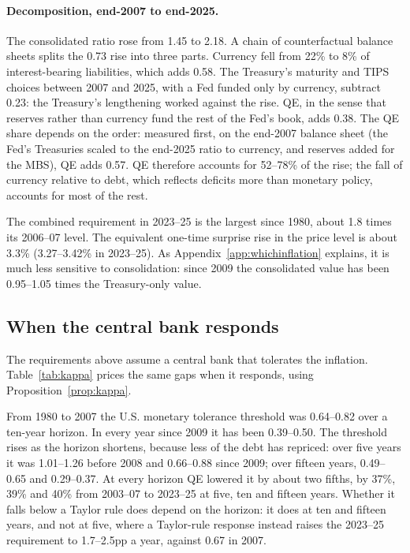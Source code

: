 \paragraph{Decomposition, end-2007 to end-2025.} The consolidated ratio rose from 1.45 to 2.18. A chain of counterfactual balance sheets splits the 0.73 rise into three parts. Currency fell from 22\% to 8\% of interest-bearing liabilities, which adds 0.58. The Treasury's maturity and TIPS choices between 2007 and 2025, with a Fed funded only by currency, subtract 0.23: the Treasury's lengthening worked against the rise. QE, in the sense that reserves rather than currency fund the rest of the Fed's book, adds 0.38. The QE share depends on the order: measured first, on the end-2007 balance sheet (the Fed's Treasuries scaled to the end-2025 ratio to currency, and reserves added for the MBS), QE adds 0.57. QE therefore accounts for 52--78\% of the rise; the fall of currency relative to debt, which reflects deficits more than monetary policy, accounts for most of the rest.

The combined requirement in 2023--25 is the largest since 1980, about 1.8 times its 2006--07 level. The equivalent one-time surprise rise in the price level is about 3.3\% (3.27--3.42\% in 2023--25). As Appendix~\ref{app:whichinflation} explains, it is much less sensitive to consolidation: since 2009 the consolidated value has been 0.95--1.05 times the Treasury-only value.

\subsection{When the central bank responds}\label{sec:kappa}

The requirements above assume a central bank that tolerates the inflation. Table~\ref{tab:kappa} prices the same gaps when it responds, using Proposition~\ref{prop:kappa}.



From 1980 to 2007 the U.S. monetary tolerance threshold was 0.64--0.82 over a ten-year horizon. In every year since 2009 it has been 0.39--0.50. The threshold rises as the horizon shortens, because less of the debt has repriced: over five years it was 1.01--1.26 before 2008 and 0.66--0.88 since 2009; over fifteen years, 0.49--0.65 and 0.29--0.37. At every horizon QE lowered it by about two fifths, by 37\%, 39\% and 40\% from 2003--07 to 2023--25 at five, ten and fifteen years. Whether it falls below a Taylor rule does depend on the horizon: it does at ten and fifteen years, and not at five, where a Taylor-rule response instead raises the 2023--25 requirement to 1.7--2.5pp a year, against 0.67 in 2007.

